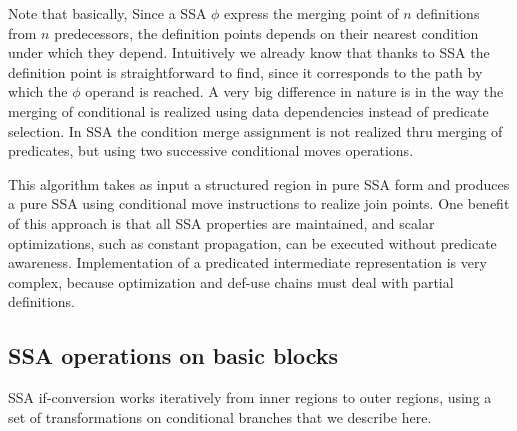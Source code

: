 Note that basically, Since a SSA $\phi$ express the merging point of $n$ definitions from $n$ predecessors, the definition points depends on their nearest condition under which they depend. Intuitively we already know that thanks to SSA the definition point is straightforward to find, since it corresponds to the path by which the $\phi$ operand is reached. 
A very big difference in nature is in the way the merging of conditional is realized using data dependencies instead of predicate selection. In SSA the condition merge assignment is not realized thru merging of predicates, but using two successive conditional moves operations.

This algorithm takes as input a structured region in pure SSA form and produces a pure SSA using conditional move instructions to realize join points. One benefit of this approach is that all SSA properties are maintained, and scalar optimizations, such as constant propagation, can be executed without predicate awareness. Implementation of a predicated intermediate representation is very complex, because optimization and def-use chains must deal with partial definitions.

\subsection{SSA operations on basic blocks}

SSA if-conversion works iteratively from inner regions to outer regions, using a set of transformations on conditional branches that we describe here.

